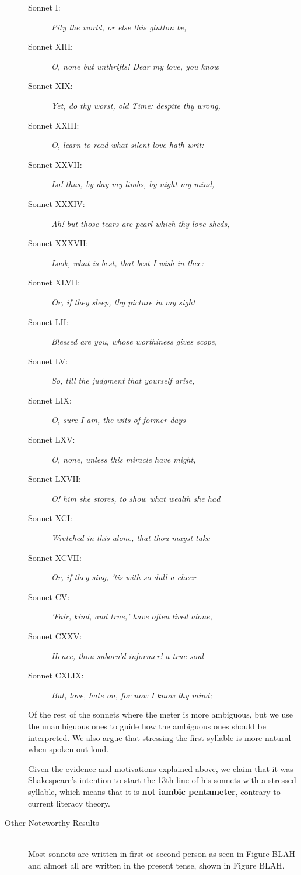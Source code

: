 \begin{description}
\begin{description}
\item[Sonnet I: ] \textit{Pity the world, or else this glutton be,}
\item[Sonnet XIII: ] \textit{O, none but unthrifts! Dear my love, you know}
\item[Sonnet XIX: ] \textit{Yet, do thy worst, old Time: despite thy wrong,}
\item[Sonnet XXIII: ] \textit{O, learn to read what silent love hath writ:}
\item[Sonnet XXVII: ] \textit{Lo! thus, by day my limbs, by night my mind,}
\item[Sonnet XXXIV: ] \textit{Ah! but those tears are pearl which thy love sheds,}
\item[Sonnet XXXVII: ] \textit{Look, what is best, that best I wish in thee:}
\item[Sonnet XLVII: ] \textit{Or, if they sleep, thy picture in my sight}
\item[Sonnet LII: ] \textit{Blessed are you, whose worthiness gives scope,}
\item[Sonnet LV: ] \textit{So, till the judgment that yourself arise,}
\item[Sonnet LIX: ] \textit{O, sure I am, the wits of former days}
\item[Sonnet LXV: ] \textit{O, none, unless this miracle have might,}
\item[Sonnet LXVII: ] \textit{O! him she stores, to show what wealth she had}
\item[Sonnet XCI: ] \textit{Wretched in this alone, that thou mayst take}
\item[Sonnet XCVII: ] \textit{Or, if they sing, 'tis with so dull a cheer}
\item[Sonnet CV: ] \textit{'Fair, kind, and true,' have often lived alone,}
\item[Sonnet CXXV: ] \textit{Hence, thou suborn'd informer! a true soul}
\item[Sonnet CXLIX: ] \textit{But, love, hate on, for now I know thy mind;}
\end{description}

Of the rest of the sonnets where the meter is more ambiguous, but we use the unambiguous ones to guide how the ambiguous ones should be interpreted. We also argue that stressing the first syllable is more natural when spoken out loud.

Given the evidence and motivations explained above, we claim that it was Shakespeare's intention to start the 13th line of his sonnets with a stressed syllable, which means that it is \textbf{not iambic pentameter}, contrary to current literacy theory.

\item[Other Noteworthy Results]  \hfill \\
Most sonnets are written in first or second person as seen in Figure BLAH and almost all are written in the present tense, shown in Figure BLAH.
\end{description}

